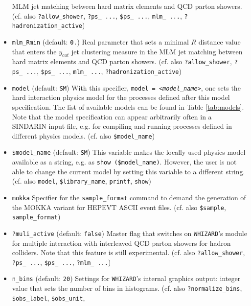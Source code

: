 \documentclass[12pt]{book}
\newcommand{\ttt}[1]{\texttt{#1}}
\newcommand{\whizard}{\texttt{WHIZARD}}
\begin{document}
\begin{itemize}
MLM jet matching between hard matrix elements and QCD parton showers. 
(cf. also \ttt{?allow\_shower}, \ttt{?ps\_ ...}, \ttt{\$ps\_ ...},
\ttt{mlm\_ ...}, \ttt{?hadronization\_active})  
\item
\ttt{mlm\_Rmin} \qquad (default: \ttt{0.}) \newline
Real parameter that sets a minimal $R$ distance value that enters the
$y_{cut}$ jet clustering measure in the MLM jet matching between hard
matrix elements and QCD parton showers.  (cf. also
\ttt{?allow\_shower}, \ttt{?ps\_ ...}, \ttt{\$ps\_ ...}, \ttt{mlm\_
...}, \ttt{?hadronization\_active}) 
\item
\ttt{model} \qquad (default: \ttt{SM}) \newline
With this specifier, \ttt{model = {\em <model\_name>}}, one sets the hard
interaction physics model for the processes defined after this model
specification. The list of available models can be found in Table
\ref{tab:models}. Note that the model specification can appear
arbitrarily often in a SINDARIN input file, e.g. for compiling and
running processes defined in different physics models. (cf. also
\ttt{\$model\_name})
\item
\ttt{\$model\_name} \qquad (default: \ttt{SM}) \newline
This variable makes the locally used physics model available as a
string, e.g. as \ttt{show (\$model\_name)}. However, the user is not
able to change the current model by setting this variable to a
different string. (cf. also \ttt{model}, \ttt{\$library\_name},
\ttt{printf}, \ttt{show})
\item
\ttt{mokka} \newline 
Specifier for the \ttt{sample\_format} command to demand the
generation of the MOKKA variant for HEPEVT ASCII event
files. (cf. also \ttt{\$sample}, 
\ttt{sample\_format}) 
\item
\ttt{?muli\_active} \qquad (default: \ttt{false}) \newline
Master flag that switches on \whizard's module for multiple
interaction with interleaved QCD parton showers for hadron
colliders. Note that this feature is still experimental. (cf. also
\ttt{?allow\_shower}, \ttt{?ps\_ ...}, \ttt{\$ps\_ ...}, \ttt{?mlm\_
  ...})  
\item
\ttt{n\_bins} \qquad (default: \ttt{20}) \newline
Settings for \whizard's internal graphics output: integer value that
sets the number of bins in histograms. (cf. also
\ttt{?normalize\_bins}, \ttt{\$obs\_label}, \ttt{\$obs\_unit},

\end{itemize}
\end{document}

